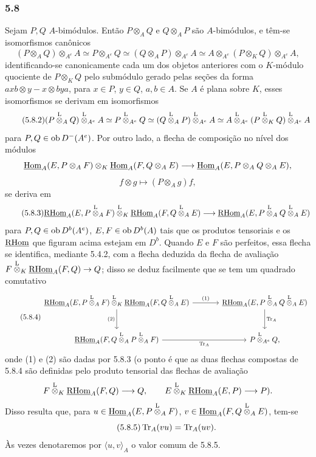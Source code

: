 \subsubsection*{5.8}

Sejam $P,Q$ $A$-bimódulos. Então $P\otimes_AQ$ e $Q\otimes_AP$ são $A$-bimódulos, e têm-se isomorfismos canônicos
\begin{equation}\tag{5.8.1}
(P\otimes_AQ)\otimes_{A^e}A\simeq P\otimes_{A^e}Q\simeq(Q\otimes_AP)\otimes_{A^e}A\simeq A\otimes_{A^e}(P\otimes_KQ)\otimes_{A^e}A,
\end{equation}
identificando-se canonicamente cada um dos objetos anteriores com o $K$-módulo quociente de $P\otimes_KQ$ pelo submódulo gerado pelas seções da forma $axb\otimes y-x\otimes bya$, para $x\in P$, $y\in Q$, $a,b\in A$. Se $A$ é plana sobre $K$, esses isomorfismos se derivam em isomorfismos
\begin{equation}\tag{5.8.2}
(P\overset{\mathrm L}{\otimes}_AQ)\overset{\mathrm L}{\otimes}_{A^e}A\simeq P\overset{\mathrm L}{\otimes}_{A^e}Q\simeq(Q\overset{\mathrm L}{\otimes}_AP)\overset{\mathrm L}{\otimes}_{A^e}A\simeq A\overset{\mathrm L}{\otimes}_{A^e}(P\overset{\mathrm L}{\otimes}_KQ)\overset{\mathrm L}{\otimes}_{A^e}A
\end{equation}
para $P,Q\in\operatorname{ob} D^-(A^e)$. Por outro lado, a flecha de composição no nível dos módulos
\[
\underline{\operatorname{Hom}}_A(E,P\otimes_AF)\otimes_K\underline{\operatorname{Hom}}_A(F,Q\otimes_AE)
\longrightarrow\underline{\operatorname{Hom}}_A(E,P\otimes_AQ\otimes_AE),
\]
\[
f\otimes g\longmapsto (P\otimes_Ag)f,
\]
se deriva em
\begin{equation}\tag{5.8.3}
\underline{\mathrm{RHom}}_A(E,P\overset{\mathrm L}{\otimes}_AF)\overset{\mathrm L}{\otimes}_K\underline{\mathrm{RHom}}_A(F,Q\overset{\mathrm L}{\otimes}_AE)
\longrightarrow\underline{\mathrm{RHom}}_A(E,P\overset{\mathrm L}{\otimes}_AQ\overset{\mathrm L}{\otimes}_AE)
\end{equation}
para $P,Q\in\operatorname{ob} D^b(A^e)$, $E,F\in\operatorname{ob} D^b(A)$ tais que os produtos tensoriais e os $\underline{\mathrm{RHom}}$ que figuram acima estejam em $D^b$. Quando $E$ e $F$ são perfeitos, essa flecha se identifica, mediante 5.4.2, com a flecha deduzida da flecha de avaliação $F\overset{\mathrm L}{\otimes}_K\underline{\mathrm{RHom}}_A(F,Q)\to Q$; disso se deduz facilmente que se tem um quadrado comutativo
\begin{equation}\tag{5.8.4}
\begin{tikzcd}[column sep=large,row sep=large]
\uRHom_A(E,P\lten_AF)\lten_K\uRHom_A(F,Q\lten_AE) \arrow[r,"(1)"] \arrow[d,"(2)"'] & \uRHom_A(E,P\lten_AQ\lten_AE) \arrow[d,"\Tr_A"]\\
\uRHom_A(F,Q\lten_AP\lten_AF) \arrow[r,"\Tr_A"'] & P\lten_{A^e}Q,
\end{tikzcd}
\end{equation}
onde (1) e (2) são dadas por 5.8.3 (o ponto é que as duas flechas compostas de 5.8.4 são definidas pelo produto tensorial das flechas de avaliação
\[
F\overset{\mathrm L}{\otimes}_K\underline{\mathrm{RHom}}_A(F,Q)\longrightarrow Q,\qquad
E\overset{\mathrm L}{\otimes}_K\underline{\mathrm{RHom}}_A(E,P)\longrightarrow P).
\]
Disso resulta que, para $u\in\underline{\operatorname{Hom}}_A(E,P\overset{\mathrm L}{\otimes}_AF)$, $v\in\underline{\operatorname{Hom}}_A(F,Q\overset{\mathrm L}{\otimes}_AE)$, tem-se
\begin{equation}\tag{5.8.5}
\operatorname{Tr}_A(vu)=\operatorname{Tr}_A(uv).
\end{equation}
Às vezes denotaremos por $\langle u,v\rangle_A$ o valor comum de 5.8.5.
